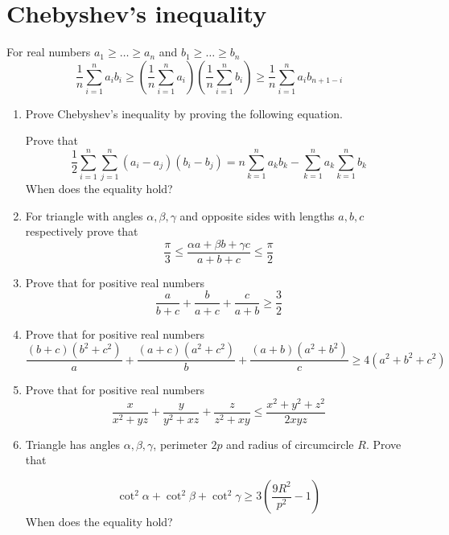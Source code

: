 \documentclass{article}
\begin{document}
\section{Chebyshev's inequality} 
For real numbers $a_1 \geq \dots \geq a_n$ and $b_1 \geq \dots \geq b_n$
$$\frac{1}{n} \sum_{i=1}^{n} a_ib_i
\geq
\left(\frac{1}{n}\sum_{i=1}^{n}a_i\right)
\left(\frac{1}{n}\sum_{i=1}^{n}b_i\right)
\geq
\frac{1}{n} \sum_{i=1}^{n} a_ib_{n+1-i} $$

\begin{enumerate}[resume]
	
	\item %
	Prove Chebyshev's inequality by proving the following equation.
	 
	Prove that
	$$ 
	\frac{1}{2} \sum_{i=1}^{n} \sum_{j=1}^{n}(a_i-a_j)(b_i-b_j)
	=
	n \sum_{k=1}^{n}a_k b_k - \sum_{k=1}^{n}a_k \sum_{k=1}^{n}b_k
	$$
	When does the equality hold?
	
	\item
	For triangle with angles $\alpha,\beta,\gamma$ and opposite sides with lengths $a,b,c$ respectively prove that
	$$\frac{\pi}{3} \leq \frac{\alpha a + \beta b + \gamma c}{a+b+c} \leq \frac{\pi}{2} $$
	
	\item %
	Prove that for positive real numbers
	$$ \frac{a}{b+c}+\frac{b}{a+c}+ \frac{c}{a+b} \geq \frac{3}{2}$$
	
	\item %
	Prove that for positive real numbers
		$$ \frac{(b+c)(b^2+c^2)}{a} + \frac{(a+c)(a^2+c^2)}{b}+\frac{(a+b)(a^2+b^2)}{c}
		\geq
		4 (a^2+b^2+c^2)
		$$
	
	\item %
	
	Prove that for positive real numbers
	$$\frac{x}{x^2+yz}+\frac{y}{y^2+xz}+\frac{z}{z^2+xy} \leq \frac{x^2+y^2+z^2}{2xyz} $$
	
	\item %
	Triangle has angles $\alpha,\beta,\gamma$, perimeter $2p$ and radius of circumcircle $R$. Prove that
	
	$$\cot^2 \alpha + \cot^2 \beta + \cot^2 \gamma  \geq 3 \left(\frac{9R^2}{p^2}-1\right)$$
	When does the equality hold?
	
\end{enumerate}
\end{document}
